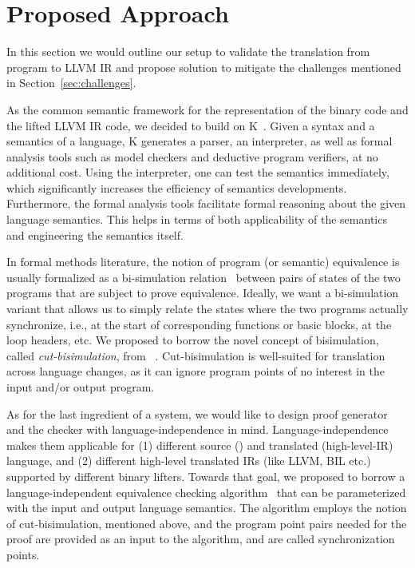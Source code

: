 \section{Proposed Approach}\label{sec:approach} In this section we would
outline our setup to validate the translation from \ISA program to LLVM IR and
propose solution to mitigate the challenges mentioned in
Section~\ref{sec:challenges}.


As the common semantic framework for the representation of the binary code and
the lifted LLVM IR code, we decided to build on K~\cite{k-primer-2013-v32}.
        Given a syntax and a semantics of a language, K generates a parser, an
        interpreter, as well as formal analysis tools such as model checkers
        and deductive program verifiers, at no additional cost.  Using the
        interpreter, one can test the semantics immediately, which
        significantly increases the efficiency of semantics developments.
        Furthermore, the formal analysis tools facilitate formal reasoning
        about the given language semantics. This helps in terms of both
        applicability of the semantics and engineering the semantics itself.
    

In formal methods literature, the notion of program (or semantic) equivalence
is usually formalized as a bi-simulation relation~\cite{Sangiorgi:2011} between
pairs of states of the two programs that are subject to prove equivalence.
Ideally, we want a bi-simulation variant that allows us to simply relate the
states where the two programs actually synchronize, i.e., at the start of
corresponding functions or basic blocks, at the loop headers, etc. We proposed to borrow the novel concept of bisimulation, called \emph{cut-bisimulation}, from
~\cite{TheoSAS19}.  Cut-bisimulation is well-suited for translation  across
language changes, as it can ignore program points of no interest in the input
and/or output program.
%

As for the last ingredient of a \TV system, we would like to design proof
generator and the checker with language-independence in mind.
Language-independence makes them applicable for (1) different source (\ISA) and
translated (high-level-IR) language, and (2) different high-level translated
IRs (like LLVM, BIL etc.) supported by different binary lifters.  Towards that
goal, we proposed to borrow a language-independent equivalence checking
algorithm~\cite{TheoSAS19} that can be parameterized with the input and output
language semantics. The algorithm employs the notion of cut-bisimulation,
         mentioned above, and the program point pairs needed for the proof are
         provided  as an input to the algorithm, and are called synchronization
         points. 

